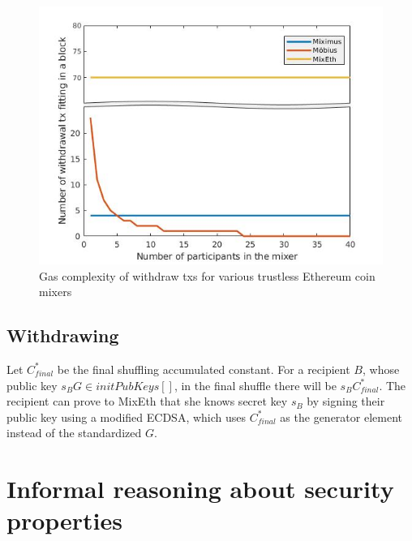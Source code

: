 \documentclass[a4paper]{article}
\theoremstyle{definition}
\begin{document}
\begin{figure}
	\centering
	\includegraphics[scale=0.35]{./withdrawalComplexity.jpg}
	\captionsetup{justification=centering}
	\caption{Gas complexity of withdraw txs for various trustless Ethereum coin mixers}
\end{figure} 

\subsection{Withdrawing}
Let $C^*_{final}$ be the final shuffling accumulated constant. For a recipient $B$, whose public key $s_{B}G \in initPubKeys[]$, in the final shuffle there will be $s_{B}C^*_{final}$. The recipient can prove to MixEth that she knows secret key $s_{B}$ by signing their public key using a modified ECDSA, which uses $C^*_{final}$ as the generator element instead of the standardized $G$.

\section{Informal reasoning about security properties}
\end{document}
